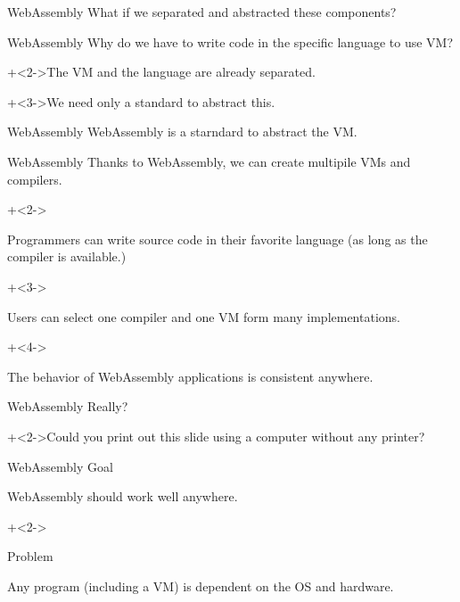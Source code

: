 \begin{frame}{WebAssembly}{}
    What if we separated and abstracted these components?    
\end{frame}


\begin{frame}{WebAssembly}{}
    Why do we have to write code in the specific language to use VM?
    \vspace{4ex}

    \onslide+<2->{The VM and the language are already separated.}
    \vspace{4ex}

    \onslide+<3->{We need only a standard to abstract this.}
\end{frame}


\begin{frame}{WebAssembly}{}
    {\Large WebAssembly is a starndard to abstract the VM.}
\end{frame}


\begin{frame}{WebAssembly}{}
    Thanks to WebAssembly, we can create multipile VMs and compilers.
    \vspace{4ex}

    \begin{itemize}
        \onslide+<2->{\item Programmers can write source code in their favorite language (as long as the compiler is available.)}
        \onslide+<3->{\item Users can select one compiler and one VM form many implementations.}
        \onslide+<4->{\item The behavior of WebAssembly applications is consistent anywhere.}
    \end{itemize}
\end{frame}


\begin{frame}{WebAssembly}{}
    {\Huge Really?}
    \vspace{4ex}

    \onslide+<2->{Could you print out this slide using a computer without any printer?}
\end{frame}


\begin{frame}{WebAssembly}{}
    Goal
    \vspace{2ex}

    WebAssembly should work well anywhere.
    \vspace{4ex}

    \onslide+<2->{
        Problem
        \vspace{2ex}

        Any program (including a VM) is dependent on the OS and hardware.
    }
\end{frame}


